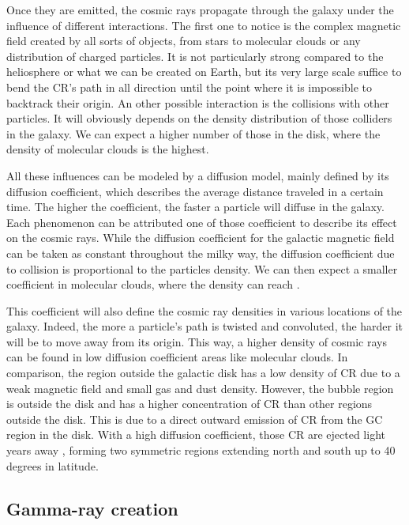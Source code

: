 Once they are emitted, the cosmic rays propagate through the galaxy under the influence of different interactions.
The first one to notice is the complex magnetic field created by all sorts of objects, from stars to molecular clouds or any distribution of charged particles. It is not particularly strong  compared to the heliosphere or what we can be created on Earth, but its very large scale suffice to bend the CR's path in all direction until the point where it is impossible to backtrack their origin.
An other possible interaction is the collisions with other particles. It will obviously depends on the density distribution of those colliders in the galaxy. We can expect a higher number of those in the disk, where the density of molecular clouds is the highest.

All these influences can be modeled by a diffusion model, mainly defined by its diffusion coefficient, which describes the average distance traveled in a certain time. The higher the coefficient, the faster a particle will diffuse in the galaxy. Each phenomenon can be attributed one of those coefficient to describe its effect on the cosmic rays. 
While the diffusion coefficient for the galactic magnetic field can be taken as constant throughout the milky way, the diffusion coefficient due to collision is proportional to the particles density. We can then expect a smaller coefficient in molecular clouds, where the density can reach .

This coefficient will also define the cosmic ray densities in various locations of the galaxy. Indeed, the more a particle's path is twisted and convoluted, the harder it will be to move away from its origin. This way, a higher density of cosmic rays can be found in low diffusion coefficient areas like molecular clouds. In comparison, the region outside the galactic disk has a low density of CR due to a weak magnetic field and small gas and dust density. However, the bubble region is outside the disk and has a higher concentration of CR than other regions outside the disk. This is due to a direct outward emission of CR from the GC region in the disk. With a high diffusion coefficient, those CR are ejected light years away , forming two symmetric regions extending north and south up to 40 degrees in latitude.


\subsection{Gamma-ray creation}


